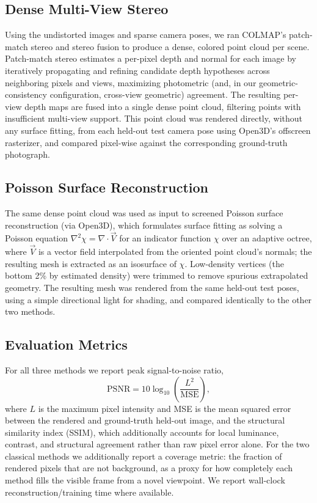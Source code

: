 \documentclass[conference]{IEEEtran}
\begin{document}
\subsection{Dense Multi-View Stereo}
Using the undistorted images and sparse camera poses, we ran COLMAP's patch-match stereo and stereo fusion \cite{schonberger2016mvs} to produce a dense, colored point cloud per scene. Patch-match stereo estimates a per-pixel depth and normal for each image by iteratively propagating and refining candidate depth hypotheses across neighboring pixels and views, maximizing photometric (and, in our geometric-consistency configuration, cross-view geometric) agreement. The resulting per-view depth maps are fused into a single dense point cloud, filtering points with insufficient multi-view support. This point cloud was rendered directly, without any surface fitting, from each held-out test camera pose using Open3D's offscreen rasterizer, and compared pixel-wise against the corresponding ground-truth photograph.

\subsection{Poisson Surface Reconstruction}
The same dense point cloud was used as input to screened Poisson surface reconstruction \cite{kazhdan2013screened} (via Open3D), which formulates surface fitting as solving a Poisson equation $\nabla^2 \chi = \nabla \cdot \vec{V}$ for an indicator function $\chi$ over an adaptive octree, where $\vec{V}$ is a vector field interpolated from the oriented point cloud's normals; the resulting mesh is extracted as an isosurface of $\chi$. Low-density vertices (the bottom 2\% by estimated density) were trimmed to remove spurious extrapolated geometry. The resulting mesh was rendered from the same held-out test poses, using a simple directional light for shading, and compared identically to the other two methods.

\subsection{Evaluation Metrics}
For all three methods we report peak signal-to-noise ratio,
\begin{equation}
\text{PSNR} = 10 \log_{10}\left(\frac{L^2}{\text{MSE}}\right),
\end{equation}
where $L$ is the maximum pixel intensity and MSE is the mean squared error between the rendered and ground-truth held-out image, and the structural similarity index (SSIM), which additionally accounts for local luminance, contrast, and structural agreement rather than raw pixel error alone. For the two classical methods we additionally report a coverage metric: the fraction of rendered pixels that are not background, as a proxy for how completely each method fills the visible frame from a novel viewpoint. We report wall-clock reconstruction/training time where available.
\end{document}
